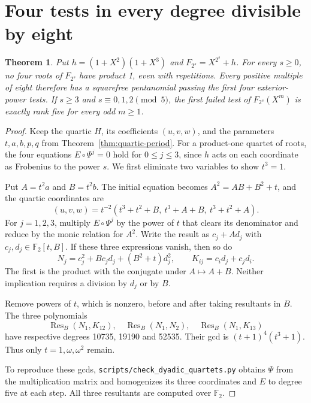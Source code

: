 \documentclass[11pt]{article}
\newtheorem{theorem}{Theorem}
\newcommand{\F}{\mathbb F_2}
\begin{document}
\section{Four tests in every degree divisible by eight}
\begin{theorem}\label{thm:all-quartets}
Put \(h=(1+X^2)(1+X^3)\) and \(F_{2^s}=X^{2^s}+h\).
For every \(s\ge0\), no four roots of \(F_{2^s}\) have product 1,
even with repetitions. Every positive multiple of eight therefore has
a squarefree pentanomial passing the first four exterior-power tests.
If \(s\ge3\) and \(s\equiv0,1,2\pmod5\), the first failed test of
\(F_{2^s}(X^m)\) is exactly rank five for every odd \(m\ge1\).
\end{theorem}
\begin{proof}
Keep the quartic \(H\), its coefficients \((u,v,w)\), and the parameters
\(t,a,b,p,q\) from Theorem~\ref{thm:quartic-period}.
For a product-one quartet of roots, the four equations
\(E\circ\Psi^j=0\) hold for \(0\le j\le3\), since \(h\) acts on each
coordinate as Frobenius to the power \(s\). We first eliminate two
variables to show \(t^3=1\).

Put \(A=t^2a\) and \(B=t^2b\). The initial equation becomes
\(A^2=AB+B^2+t\), and the quartic coordinates are
\[
 (u,v,w)=t^{-2}(t^3+t^2+B,\ t^3+A+B,\ t^3+t^2+A).
\]
For \(j=1,2,3\), multiply \(E\circ\Psi^j\) by the power of \(t\) that
clears its denominator and reduce by the monic relation for \(A^2\).
Write the result as \(c_j+A d_j\) with \(c_j,d_j\in\F[t,B]\).
If these three expressions vanish, then so do
\[
 N_j=c_j^2+B c_jd_j+(B^2+t)d_j^2,\qquad
 K_{ij}=c_i d_j+c_j d_i.
\]
The first is the product with the conjugate under \(A\mapsto A+B\).
Neither implication requires a division by \(d_j\) or by \(B\).

Remove powers of \(t\), which is nonzero, before and after taking
resultants in \(B\). The three polynomials
\[
 \operatorname{Res}_B(N_1,K_{12}),\quad
 \operatorname{Res}_B(N_1,N_2),\quad
 \operatorname{Res}_B(N_1,K_{13})
\]
have respective degrees 10735, 19190 and 52535. Their gcd is
\((t+1)^4(t^3+1)\). Thus only \(t=1,\omega,\omega^2\) remain.

To reproduce these gcds, \texttt{scripts/check\_dyadic\_quartets.py} obtains
\(\Psi\) from the multiplication matrix and homogenizes its three
coordinates and \(E\) to degree five at each step. All three resultants
are computed over \(\F\).


\end{proof}
\end{document}
